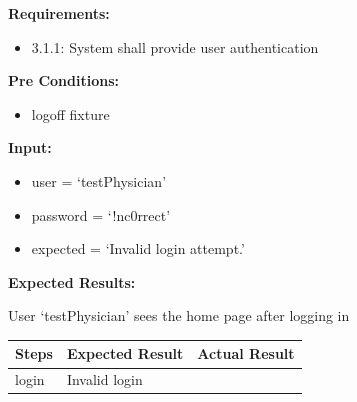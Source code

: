 \documentclass[letterpaper,10pt,english]{sphinxmanual}
\begin{document}
\begin{fulllineitems}
\label{STD/test_login:test_login.test_login_bad_pass}
\textbf{Requirements:}
\begin{itemize}
\item {} 
3.1.1: System shall provide user authentication

\end{itemize}

\textbf{Pre Conditions:}
\begin{itemize}
\item {} 
logoff fixture

\end{itemize}

\textbf{Input:}
\begin{itemize}
\item {} 
user = `testPhysician'

\item {} 
password = `!nc0rrect'

\item {} 
expected = `Invalid login attempt.'

\end{itemize}

\textbf{Expected Results:}

User `testPhysician' sees the home page after logging in

\begin{tabulary}{\linewidth}{|L|L|L|}
\hline
\textsf{\relax 
Steps
} & \textsf{\relax 
Expected Result
} & \textsf{\relax 
Actual Result
}\\
\hline
login
 & 
Invalid login
 & \\
\hline\end{tabulary}


\end{fulllineitems}

\end{document}
